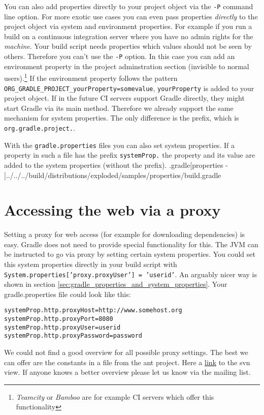You can also add properties directly to your project object via the \texttt{-P} command line option. For more exotic use cases you can even pass properties \emph{directly} to the project object via system and environment properties. For example if you run a build on a continuous integration server where you have no admin rights for the \emph{machine}. Your build script needs properties which values should not be seen by others. Therefore you can't use the \texttt{-P} option. In this case you can add an environment property in the project adminstration section (invisible to normal users).\footnote{\emph{Teamcity} or \emph{Bamboo} are for example CI servers which offer this functionality} If the environment property follows the pattern \texttt{ORG\_GRADLE\_PROJECT\_yourProperty=somevalue}, \texttt{yourProperty} is added to your project object. If in the future CI servers support Gradle directly, they might start Gradle via its main method. Therefore we already support the same mechanism for system properties. The only difference is the prefix, which is \texttt{org.gradle.project.}.

With the \texttt{gradle.properties} files you can also set system properties. If a property in such a file has the prefix \texttt{systemProp.} the property and its value are added to the system properties (without the prefix).
\codebuild.gradle[properties - ]{../../../build/distributions/exploded/samples/properties/build.gradle}

\section{Accessing the web via a proxy} %
\label{sec:accessing_the_web_via_a_proxy}
Setting a proxy for web access (for example for downloading dependencies) is easy. Gradle does not need to provide special functionality for this. The JVM can be instructed to go via proxy by setting certain system properties. You could set this system properties directly in your build script with \texttt{System.properties['proxy.proxyUser'] = 'userid'}. An arguably nicer way is shown in section \ref{sec:gradle_properties_and_system_properties}. Your gradle.properties file could look like this:
\begin{Verbatim}
systemProp.http.proxyHost=http://www.somehost.org
systemProp.http.proxyPort=8080
systemProp.http.proxyUser=userid
systemProp.http.proxyPassword=password	
\end{Verbatim}
We could not find a good overview for all possible proxy settings. The best we can offer are the constants in a file from the ant project. Here a \href{http://svn.apache.org/viewvc/ant/core/trunk/src/main/org/apache/tools/ant/util/ProxySetup.java?view=markup&pathrev=556977}{link} to the svn view. If anyone knows a better overview please let us know via the mailing list.  




